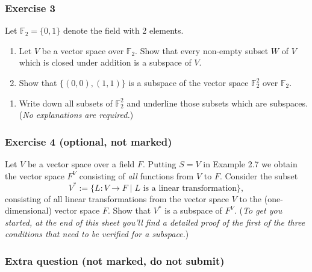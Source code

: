 \documentclass[
  12pt,
  a4paper,
  twoside]{article}
\providecommand{\tightlist}{%
  \setlength{\itemsep}{0pt}\setlength{\parskip}{0pt}}
\theoremstyle{plain}
\theoremstyle{definition}
\begin{document}
\hypertarget{exercise-3-4}{%
\subsubsection*{Exercise 3}\label{exercise-3-4}}

Let \(\mathbb{F}_2 = \{0, 1\}\) denote the field with 2 elements.

\begin{enumerate}
\def\labelenumi{(\alph{enumi})}
\item
  Let \(V\) be a vector space over \(\mathbb{F}_2\). Show that every
  non-empty subset \(W\) of \(V\) which is closed under addition is a
  subspace of \(V\).
\item
  Show that \(\{(0,0), (1,1)\}\) is a subspace of the vector
  space \(\mathbb{F}_2^2\) over \(\mathbb{F}_2\).
\end{enumerate}

\begin{enumerate}
\def\labelenumi{(\alph{enumi})}
\setcounter{enumi}{2}
\tightlist
\item
  Write down all subsets of \(\mathbb{F}_2^2\) and underline those
  subsets which are subspaces. (\emph{No explanations are
  required.})
\end{enumerate}

\hypertarget{exercise-4-optional-not-marked}{%
\subsubsection*{Exercise 4 (optional, not marked)}\label{exercise-4-optional-not-marked}}

Let \(V\) be a vector space over a field \(F\). Putting \(S=V\) in
Example 2.7 we obtain the vector space \(F^V\) consisting of
\emph{all} functions from \(V\) to \(F\). Consider the subset
\[V^*:=\{L:V \rightarrow F \;|\; L \textrm{ is a linear
transformation}\},\] consisting of all linear transformations
from the vector space \(V\) to the (one-dimensional) vector space
\(F\). Show that \(V^{*}\) is a subspace of \(F^{V}\).
(\emph{To get you started, at the end of this sheet you'll find a detailed
proof of the first of the three conditions that need to be verified for a
subspace.})

\hypertarget{extra-question-not-marked-do-not-submit}{%
\subsubsection*{Extra question (not marked, do not submit)}\label{extra-question-not-marked-do-not-submit}}
\end{document}
